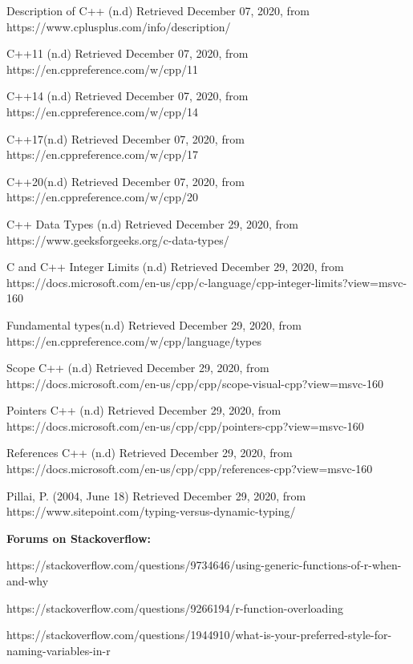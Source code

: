 \documentclass[12pt]{article}
\begin{document}
\begin{thebibliography}{50}
Description of C++ (n.d) Retrieved December 07, 2020, from https://www.cplusplus.com/info/description/

C++11 (n.d) Retrieved December 07, 2020, from https://en.cppreference.com/w/cpp/11

C++14 (n.d) Retrieved December 07, 2020, from https://en.cppreference.com/w/cpp/14

C++17(n.d) Retrieved December 07, 2020, from https://en.cppreference.com/w/cpp/17

C++20(n.d) Retrieved December 07, 2020, from https://en.cppreference.com/w/cpp/20

C++ Data Types (n.d) Retrieved December 29, 2020, from https://www.geeksforgeeks.org/c-data-types/

C and C++ Integer Limits (n.d) Retrieved December 29, 2020, from https://docs.microsoft.com/en-us/cpp/c-language/cpp-integer-limits?view=msvc-160

Fundamental types(n.d) Retrieved December 29, 2020, from https://en.cppreference.com/w/cpp/language/types

Scope C++ (n.d) Retrieved December 29, 2020, from https://docs.microsoft.com/en-us/cpp/cpp/scope-visual-cpp?view=msvc-160

Pointers C++ (n.d) Retrieved December 29, 2020, from https://docs.microsoft.com/en-us/cpp/cpp/pointers-cpp?view=msvc-160

References C++ (n.d) Retrieved December 29, 2020, from https://docs.microsoft.com/en-us/cpp/cpp/references-cpp?view=msvc-160

Pillai, P. (2004, June 18) Retrieved December 29, 2020, from https://www.sitepoint.com/typing-versus-dynamic-typing/

\textbf{Forums on Stackoverflow:}

https://stackoverflow.com/questions/9734646/using-generic-functions-of-r-when-and-why

https://stackoverflow.com/questions/9266194/r-function-overloading

https://stackoverflow.com/questions/1944910/what-is-your-preferred-style-for-naming-variables-in-r

\end{thebibliography}
\end{document}
